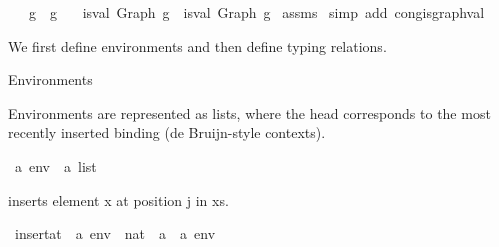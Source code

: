 \begin{isabellebody}
\ \ \ {\isachardoublequoteopen}g{}\ {\isasymsimeq}\ g{}{\isachardoublequoteclose}\isanewline
\ \ \ {\isachardoublequoteopen}is{\isacharunderscore}{\kern0pt}val\ {\isacharparenleft}{\kern0pt}Graph\ g{}{\isacharparenright}{\kern0pt}\ {\isacharequal}{\kern0pt}\ is{\isacharunderscore}{\kern0pt}val\ {\isacharparenleft}{\kern0pt}Graph\ g{}{\isacharparenright}{\kern0pt}{\isachardoublequoteclose}\isanewline
%
\isadelimproof
%
\endisadelimproof
%
\isatagproof
{}\isamarkupfalse%
\ assms\isanewline
{}\isamarkupfalse%
\ {\isacharparenleft}{\kern0pt}simp\ add{\isacharcolon}{\kern0pt}\ cong{\isacharunderscore}{\kern0pt}is{\isacharunderscore}{\kern0pt}graph{\isacharunderscore}{\kern0pt}val{\isacharparenright}{\kern0pt}%
\endisatagproof
{\isafoldproof}%
%
\isadelimproof
%
\endisadelimproof
%
\isadelimdocument
%
\endisadelimdocument
%
\isatagdocument
%
\isamarkuptrue%
%
\endisatagdocument
{\isafolddocument}%
%
\isadelimdocument
%
\endisadelimdocument
%
\begin{isamarkuptext}%
We first define environments and then define typing relations.%
\end{isamarkuptext}\isamarkuptrue%
%
\begin{isamarkuptext}%
Environments%
\end{isamarkuptext}\isamarkuptrue%
%
\begin{isamarkuptext}%
Environments are represented as lists, where the head corresponds to the
  most recently inserted binding (de Bruijn-style contexts).%
\end{isamarkuptext}\isamarkuptrue%
\isamarkupfalse%
\ {\isacharparenleft}{\kern0pt}{\isacharprime}{\kern0pt}a{\isacharparenright}{\kern0pt}\ env\ {\isacharequal}{\kern0pt}\ {\isachardoublequoteopen}{\isacharprime}{\kern0pt}a\ list{\isachardoublequoteclose}%
\begin{isamarkuptext}%
 inserts element x at position j in xs.%
\end{isamarkuptext}\isamarkuptrue%
\isamarkupfalse%
\ insert{\isacharunderscore}{\kern0pt}at\ {\isacharcolon}{\kern0pt}{\isacharcolon}{\kern0pt}\ {\isachardoublequoteopen}{\isacharprime}{\kern0pt}a\ env\ {\isacharequal}{\kern0pt}{\isachargreater}{\kern0pt}\ nat\ {\isacharequal}{\kern0pt}{\isachargreater}{\kern0pt}\ {\isacharprime}{\kern0pt}a\ {\isacharequal}{\kern0pt}{\isachargreater}{\kern0pt}\ {\isacharprime}{\kern0pt}a\ env{\isachardoublequoteclose}\ \isanewline

\end{isabellebody}
